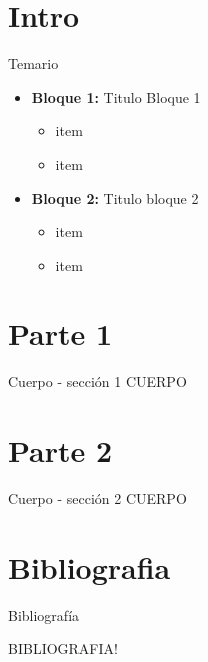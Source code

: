 \documentclass{bredelebeamer}
\begin{document}



\section{Intro}

\begin{frame}{Temario}
\begin{itemize}
\item \textbf{Bloque 1:} Titulo Bloque 1
\begin{itemize}
    \item item
    \item item
\end{itemize}
\item \textbf{Bloque 2:} Titulo bloque 2
\begin{itemize}
    \item item
    \item item
\end{itemize}
\end{itemize}

\end{frame}





\section{Parte 1}

\begin{frame}{Cuerpo - sección 1}
CUERPO
\end{frame}


\section{Parte 2}

\begin{frame}{Cuerpo - sección 2}
CUERPO
\end{frame}




\section{Bibliografia}

\begin{frame}{Bibliografía}

BIBLIOGRAFIA!

\end{frame}
\end{document}
